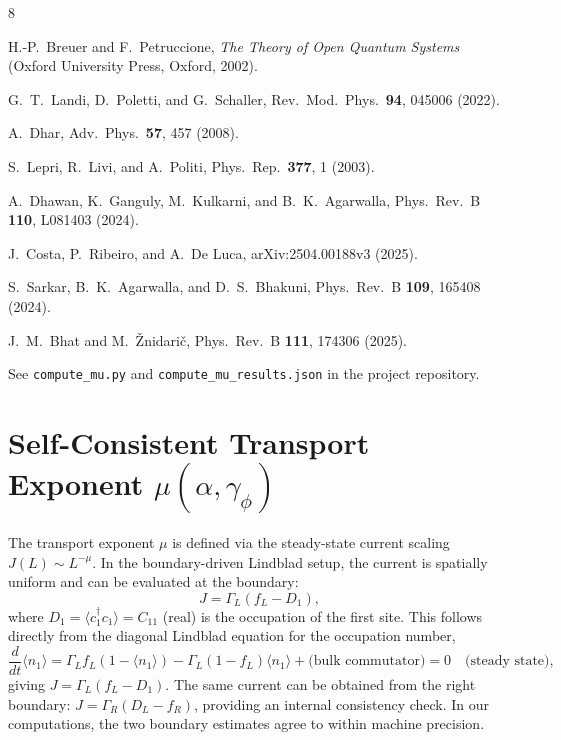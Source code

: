 \documentclass[aps,prb,twocolumn,superscriptaddress]{revtex4-2}
\begin{document}
\begin{thebibliography}{8}

H.-P.~Breuer and F.~Petruccione,
\textit{The Theory of Open Quantum Systems}
(Oxford University Press, Oxford, 2002).

G.~T.~Landi, D.~Poletti, and G.~Schaller,
Rev.\ Mod.\ Phys.\ \textbf{94}, 045006 (2022).

A.~Dhar,
Adv.\ Phys.\ \textbf{57}, 457 (2008).

S.~Lepri, R.~Livi, and A.~Politi,
Phys.\ Rep.\ \textbf{377}, 1 (2003).

A.~Dhawan, K.~Ganguly, M.~Kulkarni, and B.~K.~Agarwalla,
Phys.\ Rev.\ B \textbf{110}, L081403 (2024).

J.~Costa, P.~Ribeiro, and A.~De Luca,
arXiv:2504.00188v3 (2025).

S.~Sarkar, B.~K.~Agarwalla, and D.~S.~Bhakuni,
Phys.\ Rev.\ B \textbf{109}, 165408 (2024).

J.~M.~Bhat and M.~\v{Z}nidari\v{c},
Phys.\ Rev.\ B \textbf{111}, 174306 (2025).

See \texttt{compute\_mu.py} and \texttt{compute\_mu\_results.json}
in the project repository.

\end{thebibliography}

\section{Self-Consistent Transport Exponent $\mu(\alpha,\gamma_\phi)$}
\label{sec:S7}

The transport exponent $\mu$ is defined via the steady-state current scaling $J(L) \sim L^{-\mu}$. In the boundary-driven Lindblad setup, the current is spatially uniform and can be evaluated at the boundary:
\begin{equation}
J = \Gamma_L(f_L - D_1),
\label{eq:S8}
\end{equation}
where $D_1 = \langle c_1^\dagger c_1 \rangle = C_{11}$ (real) is the occupation of the first site. This follows directly from the diagonal Lindblad equation for the occupation number,
\begin{equation}
\frac{d}{dt}\langle n_1 \rangle = \Gamma_L f_L(1 - \langle n_1\rangle) - \Gamma_L(1-f_L)\langle n_1\rangle + \text{(bulk commutator)} = 0 \quad\text{(steady state)},
\label{eq:S9}
\end{equation}
giving $J = \Gamma_L(f_L - D_1)$. The same current can be obtained from the right boundary: $J = \Gamma_R(D_L - f_R)$, providing an internal consistency check. In our computations, the two boundary estimates agree to within machine precision.
\end{document}
